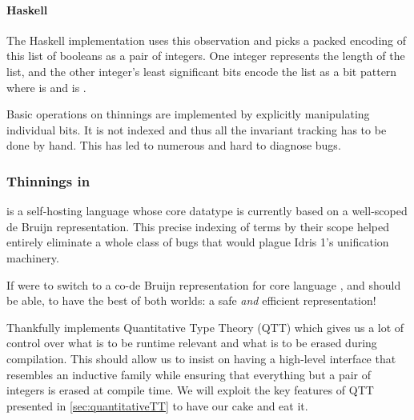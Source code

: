 \paragraph{Haskell}
The Haskell implementation uses this observation and picks a packed encoding
of this list of booleans as a pair of integers.
%
One integer represents the length  of the list, and the other
integer's  least significant bits encode the list as a bit pattern
where  is  and  is .

Basic operations on thinnings are implemented by explicitly manipulating individual bits.
%
It is not indexed and thus all the invariant tracking has to be done by hand.
This has led to numerous and hard to diagnose bugs.

\subsubsection{Thinnings in \idris}

\idris{} is a self-hosting language whose core datatype is currently based on
a well-scoped de Bruijn representation.
%
This precise indexing of terms by their scope helped entirely eliminate a whole
class of bugs that would plague Idris 1's unification machinery.

If \iftoggle{BLIND}{\idris{}}{we} were to switch to a co-de Bruijn
representation for \iftoggle{BLIND}{the}{our} core language
\iftoggle{BLIND}{the core developers would want}{we would want},
and should be able, to have the best of both worlds:
a safe \emph{and} efficient representation!

Thankfully \idris{} implements Quantitative Type Theory (QTT) which gives us a
lot of control over what is to be runtime relevant and what is to be erased
during compilation.
%
This should allow us to insist on having a high-level interface that resembles
an inductive family while ensuring that everything but a pair of integers is erased
at compile time.
%
We will exploit the key features of QTT presented in \cref{sec:quantitativeTT}
to have our cake and eat it.
